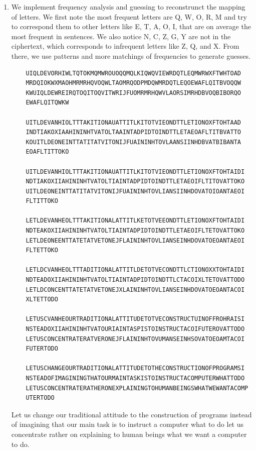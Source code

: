 \documentclass{article}
\begin{document}
\begin{enumerate}
    \clearpage

	\item We implement frequency analysis and guessing to reconstrunct the mapping of letters. We first note the most frequent letters are Q, W, O, R, M and try to correspond them to other letters
    like E, T, A, O, I, that are on average the most frequent in sentences. We also notice N, C, Z, G, Y are not in the ciphertext, which corresponds to infrequent letters like Z, Q, and X. From there, we use patterns and more matchings of frequencies to generate guesses.

    \clearpage

    \begin{lstlisting}
    UIQLDEVORHIWLTQTOKMQMWROUOQQMQLKIQWQVIEWRDQTLEQMWRWXFTWHTOAD
    MRDQIOKWXMAOHMRMRHQVOQWLTAOMRQODPMDQWMRDQTLEQOEWAFLQITBVOQQW
    KWUIQLDEWREIRQTOQITOQVITWRIJFUOMRMRHQWVLAORSIMRHDBVOQBIBORQO
    EWAFLQITQWKW

    UITLDEVANHIOLTTTAKITIONAUATTITLKITOTVIEONDTTLETIONOXFTOHTAAD
    INDTIAKOXIAAHININHTVATOLTAAINTADPIDTOINDTTLETAEOAFLTITBVATTO
    KOUITLDEONEINTTATITATVITONIJFUAININHTOVLAANSIINHDBVATBIBANTA
    EOAFLTITTOKO

    UITLDEVANHIOLTTTAKITIONAUATTITLKITOTVIEONDTTLETIONOXFTOHTAIDI
    NDTIAKOXIIAHININHTVATOLTIAINTADPIDTOINDTTLETAEOIFLTITOVATTOKO
    UITLDEONEINTTATITATVITONIJFUAININHTOVLIANSIINHDOVATOIOANTAEOI
    FLTITTOKO

    LETLDEVANHEOLTTTAKITIONALATTITLKETOTVEEONDTTLETIONOXFTOHTAIDI
    NDTEAKOXIIAHININHTVATOLTIAINTADPIDTOINDTTLETAEOIFLTETOVATTOKO
    LETLDEONEENTTATETATVETONEJFLAININHTOVLIANSEINHDOVATOEOANTAEOI
    FLTETTOKO

    LETLDCVANHEOLTTTADITIONALATTITLDETOTVECONDTTLCTIONOXXTOHTAIDI
    NDTEADOXIIAHININHTVATOLTIAINTADPIDTOINDTTLCTACOIXLTETOVATTODO
    LETLDCONCENTTATETATVETONEJXLAININHTOVLIANSEINHDOVATOEOANTACOI
    XLTETTODO

    LETUSCVANHEOURTRADITIONALATTITUDETOTVECONSTRUCTUINOFFROHRAISI
    NSTEADOXIIAHININHTVATOURIAINTASPISTOINSTRUCTACOIFUTEROVATTODO
    LETUSCONCENTRATERATVERONEJFLAININHTOVUMANSEINHSOVATOEOAMTACOI
    FUTERTODO

    LETUSCHANGEOURTRADITIONALATTITUDETOTHECONSTRUCTIONOFPROGRAMSI
    NSTEADOFIMAGININGTHATOURMAINTASKISTOINSTRUCTACOMPUTERWHATTODO
    LETUSCONCENTRATERATHERONEXPLAININGTOHUMANBEINGSWHATWEWANTACOMP
    UTERTODO
    \end{lstlisting}

    Let us change our traditional attitude to the construction of programs instead of imagining that our main task is to instruct a computer what to do let us concentrate rather on explaining to human beings what we want a computer to do.


\end{enumerate}
\end{document}
